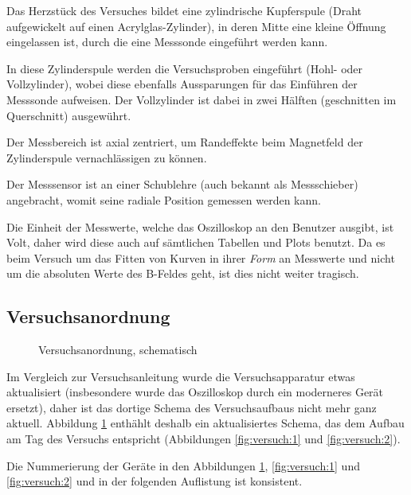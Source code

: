 Das  Herzst\"uck des  Versuches  bildet eine  zylindrische Kupferspule  (Draht
aufgewickelt  auf  einen  Acrylglas-Zylinder),  in  deren  Mitte  eine  kleine
\"Offnung eingelassen ist, durch die eine Messsonde eingef\"uhrt werden kann.

In  diese Zylinderspule  werden  die Versuchsproben  eingef\"uhrt (Hohl-  oder
Vollzylinder), wobei  diese ebenfalls  Aussparungen f\"ur das  Einf\"uhren der
Messsonde aufweisen. Der Vollzylinder ist dabei in zwei H\"alften (geschnitten
im Querschnitt) ausgew\"uhrt.

Der  Messbereich  ist axial  zentriert,  um  Randeffekte beim  Magnetfeld  der
Zylinderspule vernachl\"assigen zu k\"onnen.

Der  Messsensor  ist  an  einer Schublehre  (auch  bekannt  als  Messschieber)
angebracht, womit seine radiale Position gemessen werden kann.

Die Einheit der Messwerte, welche das Oszilloskop an den Benutzer ausgibt, ist
Volt, daher wird diese auch auf s\"amtlichen Tabellen und Plots benutzt. Da es
beim Versuch  um das Fitten von  Kurven in ihrer \emph{Form}  an Messwerte und
nicht  um  die absoluten  Werte  des  B-Feldes  geht,  ist dies  nicht  weiter
tragisch.


\subsection{Versuchsanordnung}
\label{sec:durchf:subsec:anordn}

\begin{figure}[!htb]
    \resizebox{\textwidth}{!}{}
    \caption{Versuchsanordnung, schematisch}
    \label{fig:versuch:schematic}
\end{figure}

Im  Vergleich   zur  Versuchsanleitung   wurde  die   Versuchsapparatur  etwas
aktualisiert (insbesondere wurde das  Oszilloskop durch ein moderneres Ger\"at
ersetzt),  daher  ist  das  dortige  Schema  des  Versuchsaufbaus  nicht  mehr
ganz  aktuell. Abbildung  \ref{fig:versuch:schematic} enth\"ahlt  deshalb  ein
aktualisiertes  Schema,  das  dem  Aufbau   am  Tag  des  Versuchs  entspricht
(Abbildungen \ref{fig:versuch:1} und \ref{fig:versuch:2}).

Die Nummerierung der Ger\"ate  in den Abbildungen \ref{fig:versuch:schematic},
\ref{fig:versuch:1} und  \ref{fig:versuch:2} und  in der  folgenden Auflistung
ist konsistent.

